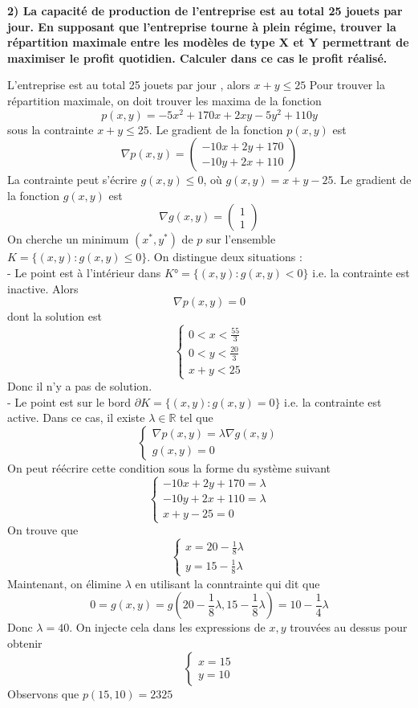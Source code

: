 \documentclass[12pt]{report}
\begin{document}
\begin{flushleft}
\textbf{
2) La capacité de production de l'entreprise est au total 25 jouets par jour. En supposant que l'entreprise tourne à plein régime, trouver la répartition maximale entre les modèles de type X et Y permettrant de maximiser le profit quotidien. Calculer dans ce cas le profit réalisé.}\end{flushleft}

\begin{flushleft}
L'entreprise est au total 25 jouets par jour , alors $x + y \leq 25$
Pour trouver la répartition maximale, on doit trouver les maxima de la fonction 
$$p(x,y) = -5x^2 + 170x + 2xy - 5y^2 + 110y$$ 
sous la contrainte $x + y \leq 25$.
Le gradient de la fonction $p(x,y)$ est 
$$\nabla p(x,y) = \begin{pmatrix} -10x + 2y + 170 \\ -10y + 2x + 110 \end{pmatrix}$$
La contrainte peut s'écrire $g(x,y) \leq 0$, où $g(x,y) = x + y - 25$. Le gradient de la fonction $g(x,y)$ est 
$$\nabla g(x,y) = \begin{pmatrix} 1 \\ 1 \end{pmatrix}$$
On cherche un minimum $(x^*,y^*)$ de $p$ sur l'ensemble $K = \{(x,y) : g(x,y) \leq 0 \}$. On distingue deux situations :\\
 - Le point est à l'intérieur dans $K° = \{(x,y) : g(x,y) < 0\}$ i.e. la contrainte est inactive. Alors
 $$\nabla p(x,y) = 0$$
 dont la solution est
 $$\begin{cases} 0 < x < \frac{55}{3} \\ 0 < y < \frac{20}{3} \\x + y < 25\end{cases}$$
 Donc il n'y a pas de solution.
 \\- Le point est sur le bord $\partial K = \{(x,y) : g(x,y) = 0 \}$ i.e. la contrainte est active. Dans ce cas, il existe $\lambda \in \mathbb{R}$ tel que
 $$\begin{cases} \nabla p(x,y) = \lambda \nabla g(x,y) \\ g(x,y) = 0 \end{cases}$$
 On peut réécrire cette condition sous la forme du système suivant
$$\begin{cases} -10x + 2y + 170 = \lambda \\ -10y + 2x + 110 = \lambda \\ x + y - 25  = 0\end{cases}$$
On trouve que 
$$\begin{cases} x = 20 - \frac{1}{8}\lambda \\ y = 15 - \frac{1}{8}\lambda \end{cases}$$
Maintenant, on élimine $\lambda$ en utilisant la conntrainte qui dit que 
$$0 = g(x,y) = g(20 - \frac{1}{8}\lambda , 15 - \frac{1}{8}\lambda) = 10 -\frac{1}{4}\lambda$$
Donc $\lambda = 40$. On injecte cela dans les expressions de $x,y$ trouvées au dessus pour obtenir
$$\begin{cases} x = 15 \\ y  = 10 \end{cases}$$
Observons que $p(15,10) = 2325$


\end{flushleft}
\end{document}
